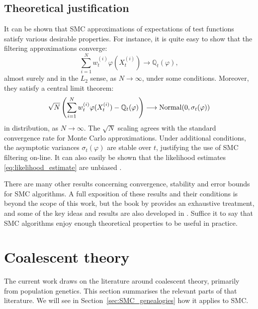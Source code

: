 \subsection{Theoretical justification}
\label{sec:SMC_theory}
It can be shown that SMC approximations of expectations of test functions satisfy various desirable properties. For instance, it is quite easy to show that the filtering approximations converge:
\begin{equation*}
\sum_{i=1}^N w_t^{(i)} \varphi( X_t^{(i)} ) 
\longrightarrow \mathbb{Q}_t(\varphi) ,
\end{equation*}
almost surely and in the $L_2$ sense, as $N\to\infty$, under some conditions.
Moreover, they satisfy a central limit theorem:
\begin{equation*}
\sqrt{N} \left( \sum_{i=1}^N w_t^{(i)} \varphi( X_t^{(i)} ) - \mathbb{Q}_t(\varphi) \right)
\longrightarrow  \operatorname{Normal}( 0, \sigma_t(\varphi) )
\end{equation*}
in distribution, as $N\to\infty$. 
The $\sqrt{N}$ scaling agrees with the standard convergence rate for Monte Carlo approximations.
Under additional conditions, the asymptotic variances $\sigma_t(\varphi)$ are stable over $t$, justifying the use of SMC filtering on-line.
It can also easily be shown that the likelihood estimates \eqref{eq:likelihood_estimate} are unbiased \parencite[see for example][Proposition 16.3]{chopin2020}.

There are many other results concerning convergence, stability and error bounds for SMC algorithms. A full exposition of these results and their conditions is beyond the scope of this work, but the book by \textcite{delmoral2013} provides an exhaustive treatment, and some of the key ideas and results are also developed in \textcite[Chapter 11]{chopin2020}.
Suffice it to say that SMC algorithms enjoy enough theoretical properties to be useful in practice.





\section{Coalescent theory}
\label{sec:coaltheory}
The current work draws on the literature around coalescent theory, primarily from population genetics. This section summarises the relevant parts of that literature. We will see in Section~\ref{sec:SMC_genealogies} how it applies to SMC.

